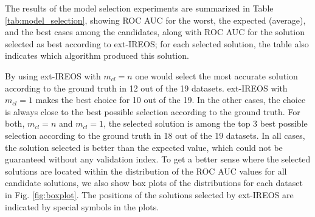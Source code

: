 The results of the model selection experiments are summarized in Table \ref{tab:model_selection}, showing ROC AUC for the worst, the expected (average), and the best cases among the candidates, along with ROC AUC for the solution selected as best according to ext-IREOS; for each selected solution, the table also indicates which algorithm produced this solution.

By using ext-IREOS with $m_{cl} = n$ one would select the most accurate solution according to the ground truth in 12 out of the 19 datasets. ext-IREOS with $m_{cl} = 1$ makes the best choice for 10 out of the 19. In the other cases, the choice is always close to the best possible selection according to the ground truth. For both, $m_{cl} = n$ and  $m_{cl} = 1$, the selected solution is among the top 3 best possible selection according to the ground truth in 18 out of the 19 datasets. In all cases, the solution selected is better than the expected value, which could not be guaranteed without any validation index. To get a better sense where the selected solutions are located within the distribution of the ROC AUC values for all candidate solutions, we also show box plots of the distributions for each dataset in Fig. \ref{fig:boxplot}. The positions of the solutions selected by ext-IREOS are indicated by special symbols in the plots.

